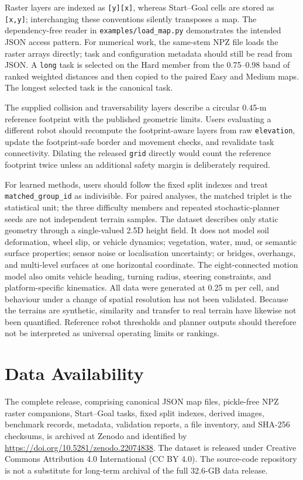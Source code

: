 \documentclass[11pt]{article}
\newcommand{\datasetrepository}{Zenodo}
\newcommand{\datasetdoi}{\url{https://doi.org/10.5281/zenodo.22074838}}
\newcommand{\datasetlicense}{Creative Commons Attribution 4.0 International (CC BY 4.0)}
\begin{document}
Raster layers are indexed as \texttt{[y][x]}, whereas Start--Goal cells are
stored as \texttt{[x,y]}; interchanging these conventions silently transposes a
map. The dependency-free reader in \texttt{examples/load\_map.py} demonstrates
the intended JSON access pattern. For numerical work, the same-stem NPZ file
loads the raster arrays directly; task and configuration metadata should still
be read from JSON. A \texttt{long} task is selected on the Hard member
from the 0.75--0.98 band of ranked weighted distances and then copied to the
paired Easy and Medium maps. The longest selected task is the canonical task.

The supplied collision and traversability layers describe a circular 0.45-m
reference footprint with the published geometric limits. Users evaluating a
different robot should recompute the footprint-aware layers from raw
\texttt{elevation}, update the footprint-safe border and movement checks, and
revalidate task connectivity. Dilating the released \texttt{grid} directly
would count the reference footprint twice unless an additional safety margin
is deliberately required.

For learned methods, users should follow the fixed split indexes and treat
\texttt{matched\_group\_id} as indivisible. For paired analyses, the matched
triplet is the statistical unit; the three difficulty members and repeated
stochastic-planner seeds are not independent terrain samples. The dataset
describes only static geometry through a single-valued 2.5D height field. It
does not model soil deformation, wheel slip, or vehicle dynamics; vegetation,
water, mud, or semantic surface properties; sensor noise or localisation
uncertainty; or bridges, overhangs, and multi-level surfaces at one horizontal
coordinate. The eight-connected motion model also omits vehicle heading,
turning radius, steering constraints, and platform-specific kinematics. All
data were generated at 0.25 m per cell, and behaviour under a change of spatial
resolution has not been validated. Because the terrains are synthetic,
similarity and transfer to real terrain have likewise not been quantified.
Reference robot thresholds and planner outputs should therefore not be
interpreted as universal operating limits or rankings.

\section{Data Availability}

The complete release, comprising canonical JSON map files, pickle-free NPZ
raster companions, Start--Goal tasks, fixed split indexes, derived images,
benchmark records, metadata, validation reports, a file inventory, and SHA-256
checksums, is archived at \datasetrepository{} and identified by
\datasetdoi{}\cite{paired25ddata}. The dataset is released under
\datasetlicense{}. The
source-code repository is not a substitute for long-term archival of the full
32.6-GB data release.
\end{document}
